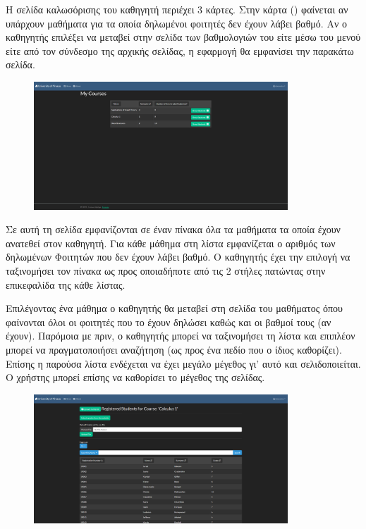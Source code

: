 \documentclass[12pt]{article}
\begin{document}
	Η σελίδα καλωσόρισης του καθηγητή περιέχει 3 κάρτες. Στην κάρτα () φαίνεται αν υπάρχουν μαθήματα για τα οποία δηλωμένοι φοιτητές δεν έχουν λάβει βαθμό. Αν ο καθηγητής επιλέξει να μεταβεί στην σελίδα των βαθμολογιών του είτε μέσω του μενού είτε από τον σύνδεσμο της αρχικής σελίδας, η εφαρμογή θα εμφανίσει την παρακάτω σελίδα.
	
	\begin{figure}[H]
		\centering
		\includegraphics[width=0.85\textwidth]{mylessons.png}
		\caption{}
		\label{fig:emptyView}
	\end{figure}
	
	Σε αυτή τη σελίδα εμφανίζονται σε έναν πίνακα όλα τα μαθήματα τα οποία έχουν ανατεθεί στον καθηγητή. Για κάθε μάθημα στη λίστα εμφανίζεται ο αριθμός των δηλωμένων Φοιτητών που δεν έχουν λάβει βαθμό. Ο καθηγητής έχει την επιλογή να ταξινομήσει τον πίνακα ως προς οποιαδήποτε από τις 2 στήλες πατώντας στην επικεφαλίδα της κάθε λίστας.
	
	Επιλέγοντας ένα μάθημα ο καθηγητής θα μεταβεί στη σελίδα του μαθήματος όπου φαίνονται όλοι οι φοιτητές που το έχουν δηλώσει καθώς και οι βαθμοί τους (αν έχουν). Παρόμοια με πριν, ο καθηγητής μπορεί να ταξινομήσει τη λίστα και επιπλέον μπορεί να πραγματοποιήσει αναζήτηση (ως προς ένα πεδίο που ο ίδιος καθορίζει). Επίσης η παρούσα λίστα ενδέχεται να έχει μεγάλο μέγεθος γι' αυτό και σελιδοποιείται. Ο χρήστης μπορεί επίσης να καθορίσει το μέγεθος της σελίδας.
	
	\begin{figure}[H]
		\centering
		\includegraphics[width=0.85\textwidth]{mystudents.png}
		\caption{}
		\label{fig:emptyView}
	\end{figure}
	
\end{document}
